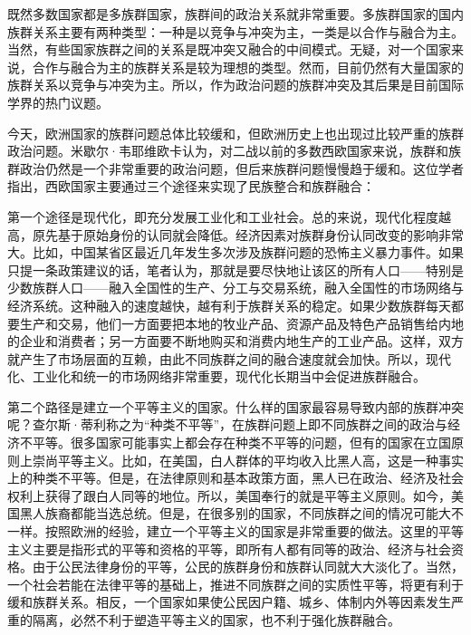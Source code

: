 既然多数国家都是多族群国家，族群间的政治关系就非常重要。多族群国家的国内族群关系主要有两种类型：一种是以竞争与冲突为主，一类是以合作与融合为主。当然，有些国家族群之间的关系是既冲突又融合的中间模式。无疑，对一个国家来说，合作与融合为主的族群关系是较为理想的类型。然而，目前仍然有大量国家的族群关系以竞争与冲突为主。所以，作为政治问题的族群冲突及其后果是目前国际学界的热门议题。

今天，欧洲国家的族群问题总体比较缓和，但欧洲历史上也出现过比较严重的族群政治问题。米歇尔·韦耶维欧卡认为，对二战以前的多数西欧国家来说，族群和族群政治仍然是一个非常重要的政治问题，但后来族群问题慢慢趋于缓和。这位学者指出，西欧国家主要通过三个途径来实现了民族整合和族群融合：

第一个途径是现代化，即充分发展工业化和工业社会。总的来说，现代化程度越高，原先基于原始身份的认同就会降低。经济因素对族群身份认同改变的影响非常大。比如，中国某省区最近几年发生多次涉及族群问题的恐怖主义暴力事件。如果只提一条政策建议的话，笔者认为，那就是要尽快地让该区的所有人口——特别是少数族群人口——融入全国性的生产、分工与交易系统，融入全国性的市场网络与经济系统。这种融入的速度越快，越有利于族群关系的稳定。如果少数族群每天都要生产和交易，他们一方面要把本地的牧业产品、资源产品及特色产品销售给内地的企业和消费者；另一方面要不断地购买和消费内地生产的工业产品。这样，双方就产生了市场层面的互赖，由此不同族群之间的融合速度就会加快。所以，现代化、工业化和统一的市场网络非常重要，现代化长期当中会促进族群融合。

第二个路径是建立一个平等主义的国家。什么样的国家最容易导致内部的族群冲突呢？查尔斯·蒂利称之为“种类不平等”，在族群问题上即不同族群之间的政治与经济不平等。很多国家可能事实上都会存在种类不平等的问题，但有的国家在立国原则上崇尚平等主义。比如，在美国，白人群体的平均收入比黑人高，这是一种事实上的种类不平等。但是，在法律原则和基本政策方面，黑人已在政治、经济及社会权利上获得了跟白人同等的地位。所以，美国奉行的就是平等主义原则。如今，美国黑人族裔都能当选总统。但是，在很多别的国家，不同族群之间的情况可能大不一样。按照欧洲的经验，建立一个平等主义的国家是非常重要的做法。这里的平等主义主要是指形式的平等和资格的平等，即所有人都有同等的政治、经济与社会资格。由于公民法律身份的平等，公民的族群身份和族群认同就大大淡化了。当然，一个社会若能在法律平等的基础上，推进不同族群之间的实质性平等，将更有利于缓和族群关系。相反，一个国家如果使公民因户籍、城乡、体制内外等因素发生严重的隔离，必然不利于塑造平等主义的国家，也不利于强化族群融合。


